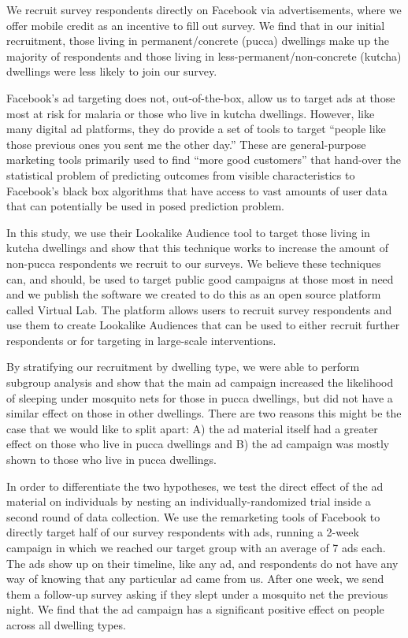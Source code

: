 \documentclass[a4paper,12pt]{article}
\theoremstyle{proposition}
\begin{document}
We recruit survey respondents directly on Facebook via advertisements, where we offer mobile credit as an incentive to fill out survey. We find that in our initial recruitment, those living in permanent/concrete (pucca) dwellings make up the majority of respondents and those living in less-permanent/non-concrete (kutcha) dwellings were less likely to join our survey.

Facebook's ad targeting does not, out-of-the-box, allow us to target ads at those most at risk for malaria or those who live in kutcha dwellings. However, like many digital ad platforms, they do provide a set of tools to target ``people like those previous ones you sent me the other day.'' These are general-purpose marketing tools primarily used to find ``more good customers'' that hand-over the statistical problem of predicting outcomes from visible characteristics to Facebook's black box algorithms that have access to vast amounts of user data that can potentially be used in posed prediction problem.

In this study, we use their Lookalike Audience tool to target those living in kutcha dwellings and show that this technique works to increase the amount of non-pucca respondents we recruit to our surveys. We believe these techniques can, and should, be used to target public good campaigns at those most in need and we publish the software we created to do this as an open source platform called Virtual Lab. The platform allows users to recruit survey respondents and use them to create Lookalike Audiences that can be used to either recruit further respondents or for targeting in large-scale interventions.

By stratifying our recruitment by dwelling type, we were able to perform subgroup analysis and show that the main ad campaign increased the likelihood of sleeping under mosquito nets for those in pucca dwellings, but did not have a similar effect on those in other dwellings. There are two reasons this might be the case that we would like to split apart: A) the ad material itself had a greater effect on those who live in pucca dwellings and B) the ad campaign was mostly shown to those who live in pucca dwellings.

In order to differentiate the two hypotheses, we test the direct effect of the ad material on individuals by nesting an individually-randomized trial inside a second round of data collection. We use the remarketing tools of Facebook to directly target half of our survey respondents with ads, running a 2-week campaign in which we reached our target group with an average of 7 ads each. The ads show up on their timeline, like any ad, and respondents do not have any way of knowing that any particular ad came from us. After one week, we send them a follow-up survey asking if they slept under a mosquito net the previous night. We find that the ad campaign has a significant positive effect on people across all dwelling types.
\end{document}
